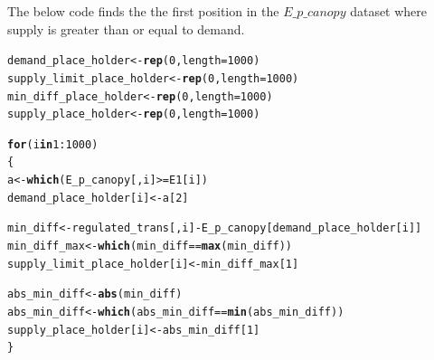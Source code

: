 \documentclass[a4paper]{article}\usepackage[]{graphicx}\usepackage[]{color}
\makeatletter
\newcommand{\hlnum}[1]{\textcolor[rgb]{0.686,0.059,0.569}{#1}}%
\newcommand{\hlopt}[1]{\textcolor[rgb]{0,0,0}{#1}}%
\newcommand{\hlstd}[1]{\textcolor[rgb]{0.345,0.345,0.345}{#1}}%
\newcommand{\hlkwa}[1]{\textcolor[rgb]{0.161,0.373,0.58}{\textbf{#1}}}%
\newcommand{\hlkwb}[1]{\textcolor[rgb]{0.69,0.353,0.396}{#1}}%
\newcommand{\hlkwc}[1]{\textcolor[rgb]{0.333,0.667,0.333}{#1}}%
\newcommand{\hlkwd}[1]{\textcolor[rgb]{0.737,0.353,0.396}{\textbf{#1}}}%
\newenvironment{kframe}{%
 \def\at@end@of@kframe{}%
 \ifinner\ifhmode%
  \def\at@end@of@kframe{\end{minipage}}%
  \begin{minipage}{\columnwidth}%
 \fi\fi%
 \def\FrameCommand##1{\hskip\@totalleftmargin \hskip-\fboxsep
 \colorbox{shadecolor}{##1}\hskip-\fboxsep
     \hskip-\linewidth \hskip-\@totalleftmargin \hskip\columnwidth}%
 \MakeFramed {\advance\hsize-\width
   \@totalleftmargin\z@ \linewidth\hsize
   \@setminipage}}%
 {\par\unskip\endMakeFramed%
 \at@end@of@kframe}
\newenvironment{knitrout}{}{} %
\makeatother
\begin{document}
\noindent The below code finds the the first position in the $E\_p\_canopy$ dataset where supply is greater than or equal to demand.  
\begin{knitrout}
\color{fgcolor}\begin{kframe}
\begin{alltt}
\hlstd{demand_place_holder} \hlkwb{<-} \hlkwd{rep}\hlstd{(}\hlnum{0}\hlstd{,} \hlkwc{length}\hlstd{=}\hlnum{1000}\hlstd{)}
\hlstd{supply_limit_place_holder} \hlkwb{<-} \hlkwd{rep}\hlstd{(}\hlnum{0}\hlstd{,} \hlkwc{length}\hlstd{=}\hlnum{1000}\hlstd{)}
\hlstd{min_diff_place_holder} \hlkwb{<-} \hlkwd{rep}\hlstd{(}\hlnum{0}\hlstd{,} \hlkwc{length}\hlstd{=}\hlnum{1000}\hlstd{)}
\hlstd{supply_place_holder} \hlkwb{<-} \hlkwd{rep}\hlstd{(}\hlnum{0}\hlstd{,} \hlkwc{length}\hlstd{=}\hlnum{1000}\hlstd{)}

\hlkwa{for}\hlstd{(i} \hlkwa{in} \hlnum{1}\hlopt{:}\hlnum{1000}\hlstd{)}
\hlstd{\{}
    \hlstd{a} \hlkwb{<-}\hlkwd{which}\hlstd{(E_p_canopy[,i]} \hlopt{>=} \hlstd{E1[i])}
    \hlstd{demand_place_holder[i]} \hlkwb{<-}\hlstd{a[}\hlnum{2}\hlstd{]}

    \hlstd{min_diff} \hlkwb{<-} \hlstd{regulated_trans[,i]} \hlopt{-} \hlstd{E_p_canopy[demand_place_holder[i]]}
    \hlstd{min_diff_max} \hlkwb{<-} \hlkwd{which}\hlstd{(min_diff} \hlopt{==} \hlkwd{max}\hlstd{(min_diff))}
    \hlstd{supply_limit_place_holder[i]} \hlkwb{<-} \hlstd{min_diff_max[}\hlnum{1}\hlstd{]}

    \hlstd{abs_min_diff} \hlkwb{<-} \hlkwd{abs}\hlstd{(min_diff)}
    \hlstd{abs_min_diff} \hlkwb{<-} \hlkwd{which}\hlstd{(abs_min_diff} \hlopt{==} \hlkwd{min}\hlstd{(abs_min_diff))}
    \hlstd{supply_place_holder[i]} \hlkwb{<-} \hlstd{abs_min_diff[}\hlnum{1}\hlstd{]}
\hlstd{\}}
\end{alltt}
\end{kframe}
\end{knitrout}
\end{document}
